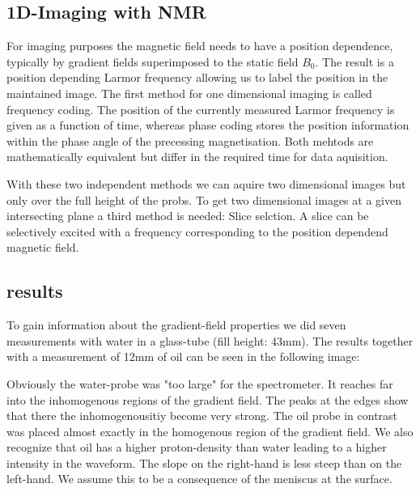 \documentclass[12pt, english]{scrartcl} %
\begin{document}
\begin{multicols}{2}
\newpage



\section{1D-Imaging with NMR}

For imaging purposes the magnetic field needs to have a position dependence, typically by gradient fields superimposed to the static field $B_0$. The result is a position depending Larmor frequency allowing us to label the position in the maintained image. 
The first method for one dimensional imaging is called frequency coding. The position of the currently measured Larmor frequency is given as a function of time, whereas phase coding stores the position information within the phase angle of the precessing magnetisation. Both mehtods are mathematically equivalent but differ in the required time for data aquisition.

With these two independent methods we can aquire two dimensional images but only over the full height of the probs. To get two dimensional images at a given intersecting plane a third method is needed: Slice selction. A slice can be selectively excited with a frequency corresponding to the position dependend magnetic field.


\subsection{results}

To gain information about the gradient-field properties we did seven measurements with water in a glass-tube (fill height: 43mm). The results together with a measurement of 12mm of oil can be seen in the following image:


Obviously the water-probe was "too large" for the spectrometer. It reaches far into the inhomogenous regions of the gradient field. The peaks at the edges show that there the inhomogenousitiy become very strong. The oil probe in contrast was placed almost exactly in the homogenous region of the gradient field. We also recognize that oil has a higher proton-density than water leading to a higher intensity in the waveform. The slope on the right-hand is less steep than on the left-hand. We assume this to be a consequence of the meniscus at the surface.


\end{multicols}
\end{document}
